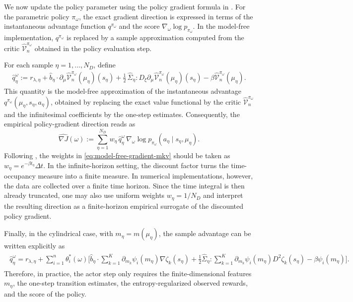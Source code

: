 \documentclass[a4paper, 10pt, english, reqno]{amsart}
\begin{document}
We now update the policy parameter using the policy gradient formula in
. For the parametric policy
$\pi_\omega$, the exact gradient direction is expressed in terms of the
instantaneous advantage function $q^{\pi_\omega}$ and the score
$\nabla_\omega\log p_{\pi_\omega}$. In the model-free implementation,
$q^{\pi_\omega}$ is replaced by a sample approximation computed from the
critic $\hat{\mathcal V}^{\pi_\omega}_n$ obtained in the policy
evaluation step.

For each sample $\eta=1,\dots,N_D$, define
\begin{align}\label{eq:sample_q_function}
      \widehat q_\eta^\omega
  :=
  r_{\lambda,\eta}
  +
  \widehat b_\eta\cdot
  \partial_\mu\hat{\mathcal V}^{\pi_\omega}_n(\mu_\eta)(s_\eta)
  +\frac12\,\widehat\Sigma_\eta:
D_\xi\partial_\mu
\hat{\mathcal V}^{\pi_\omega}_n(\mu_\eta)(s_\eta)
-\beta\hat{\mathcal V}^{\pi_\omega}_n(\mu_\eta).
\end{align}
This quantity is the model-free approximation of the instantaneous
advantage $q^{\pi_\omega}(\mu_\eta,s_\eta,a_\eta)$, obtained by
replacing the exact value functional by the critic
$\hat{\mathcal V}^{\pi_\omega}_n$ and the infinitesimal coefficients by
the one-step estimates. Consequently, the empirical policy-gradient direction reads as
\begin{equation}\label{eq:model-free-gradient-mkv}
  \widehat{\nabla J}(\omega)
  :=
  \sum_{\eta=1}^{N_D}
  w_\eta\,
  \widehat q_\eta^\omega\,
  \nabla_\omega
  \log p_{\pi_\omega}(a_\eta\mid s_\eta,\mu_\eta).
\end{equation}
Following , the weights in \eqref{eq:model-free-gradient-mkv} should be taken as $w_\eta=e^{-\beta t_\eta}\Delta t$. In the infinite-horizon setting, the discount factor turns the time-occupancy measure into a finite measure. In numerical implementations, however, the data are collected over a finite time horizon. Since the time integral is then already truncated, one may also use uniform weights $w_\eta=1/N_D$ and interpret the resulting direction as a finite-horizon empirical surrogate of the discounted policy gradient. 

Finally, in the cylindrical case, with $m_\eta=m(\mu_\eta)$, the sample
advantage can be written explicitly as
\begin{align}\label{eq:advantage_func}
\begin{aligned}
  \widehat q_\eta^\omega
  =
  r_{\lambda,\eta}
  +
  \sum_{i=1}^n\theta_i^*(\omega)
  \bigg[
\widehat b_\eta\cdot
\sum_{k=1}^K
\partial_{m_k}\psi_i(m_\eta)\nabla\zeta_k(s_\eta)
+\frac12\widehat\Sigma_\eta:
\sum_{k=1}^K
\partial_{m_k}\psi_i(m_\eta)D^2\zeta_k(s_\eta)
-\beta\psi_i(m_\eta)
\bigg].
\end{aligned}
\end{align}
Therefore, in practice, the actor step only requires the
finite-dimensional features $m_\eta$, the one-step transition estimates,
the entropy-regularized observed rewards, and the score of the policy.
\end{document}
